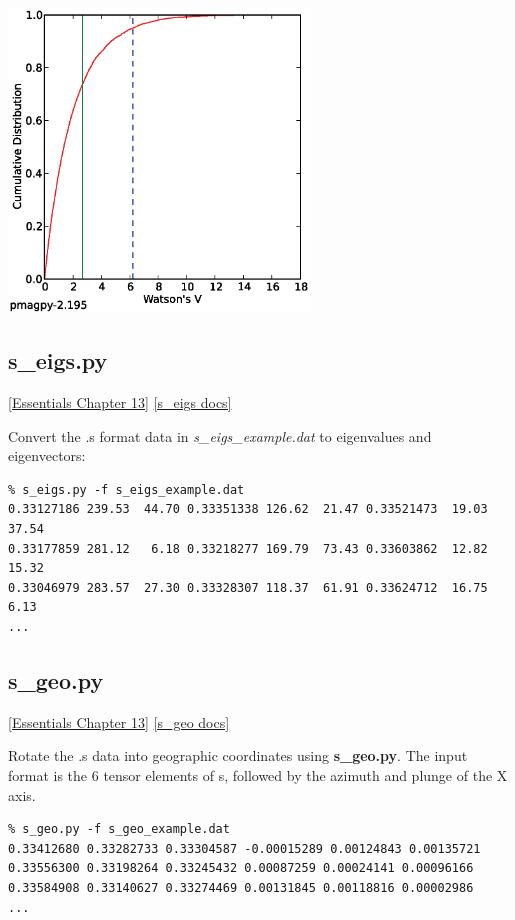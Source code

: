 \documentclass[11pt]{book}
\begin{document}
{\includegraphics[width=8cm]{EPSfiles/WatsonsV_Ao_etal2013.eps}


\subsection{s\_eigs.py}
\href{http://earthref.org/MAGIC/books/Tauxe/Essentials/WebBook3ch13.html#ch13}{[Essentials Chapter 13]}
\href{https://github.com/PmagPy/PmagPy/blob/master/programs/s_eigs.py}{[s\_eigs docs]}

Convert the .s format data in {\it s\_eigs\_example.dat} to eigenvalues and eigenvectors:

\begin{verbatim}
% s_eigs.py -f s_eigs_example.dat
0.33127186 239.53  44.70 0.33351338 126.62  21.47 0.33521473  19.03  37.54
0.33177859 281.12   6.18 0.33218277 169.79  73.43 0.33603862  12.82  15.32
0.33046979 283.57  27.30 0.33328307 118.37  61.91 0.33624712  16.75   6.13
...
\end{verbatim}


\subsection{s\_geo.py}
\href{http://earthref.org/MAGIC/books/Tauxe/Essentials/WebBook3ch13.html#ch13}{[Essentials Chapter 13]}
\href{https://github.com/PmagPy/PmagPy/blob/master/programs/s_geo.py}{[s\_geo docs]}

Rotate the .s data into geographic coordinates using {\bf s\_geo.py}.  The input format is the 6 tensor elements of s, followed by the azimuth and plunge of the X axis.

\begin{verbatim}
% s_geo.py -f s_geo_example.dat
0.33412680 0.33282733 0.33304587 -0.00015289 0.00124843 0.00135721
0.33556300 0.33198264 0.33245432 0.00087259 0.00024141 0.00096166
0.33584908 0.33140627 0.33274469 0.00131845 0.00118816 0.00002986
...
\end{verbatim}

}
\end{document}
